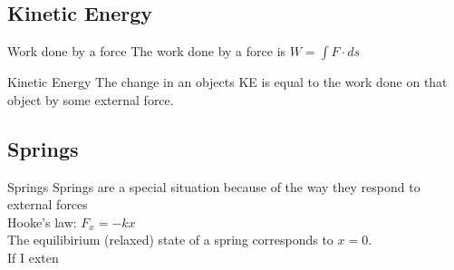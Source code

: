  \subsection{Kinetic Energy}


\begin{frame}{Work done by a force}
\small
The work done by a force is $W=\int F\cdot ds$
\vspace{10cm}
\end{frame}

\begin{frame}{Kinetic Energy}
\small
The change in an objects KE is equal to the work done on that object by some external force.\\
\vspace{10cm}
\end{frame}

 \subsection{Springs}

\begin{frame}{Springs}
\small
Springs are a special situation because of the way they respond to external forces\\[1ex]

Hooke's law: $F_{x} = -kx$\\[1ex]

The equilibirium (relaxed) state of a spring corresponds to $x=0$.\\

If I exten


\vspace{10cm}
\end{frame}
%
%
%
%

